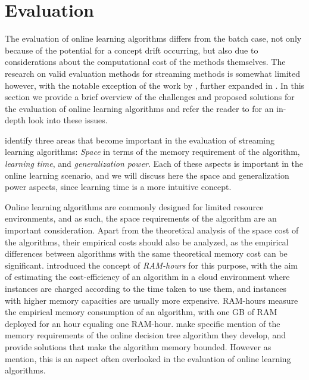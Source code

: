 
\section{Evaluation}
\label{sec:bg-ol-evaluation}

The evaluation of online learning algorithms differs from the batch
case, not only because of the potential for a concept drift occurring,
but also due to considerations about the computational cost of the
methods themselves. The research on valid evaluation methods for
streaming methods is somewhat limited however, with the notable exception
of the work by \citet{online-evaluation-kdd}, further expanded in
\cite{online-evaluation-journal}.
In this section we provide
a brief overview of the challenges and proposed solutions for
the evaluation of online learning algorithms and refer the
reader to \cite{online-evaluation-journal} for an in-depth look
into these issues.

\citet{online-evaluation-journal} identify three areas that
become important in the evaluation of streaming learning
algorithms: \emph{Space} in terms of the memory requirement of the algorithm, \emph{learning time}, and \emph{generalization power}.
Each of these aspects is important in the online learning scenario, and
we will discuss here the space and generalization power aspects, since
learning time is a more intuitive concept.


Online learning algorithms are commonly designed for limited resource environments,
and as such, the space requirements of the algorithm are an important consideration.
Apart from the theoretical analysis of the space cost of the algorithms,
their empirical costs should also be analyzed, as the empirical differences
between algorithms with the same theoretical memory cost can be
significant. \citet{ram-hours} introduced
the concept of \emph{RAM-hours} for this purpose, with the aim of estimating
the cost-efficiency of an algorithm in a cloud environment where instances
are charged according to the time taken to use them, and instances with
higher memory capacities are usually more expensive.
RAM-hours measure the empirical memory consumption of an
algorithm, with one GB of RAM deployed for an hour equaling one RAM-hour.
\citet{vfdt}
make specific mention of the memory requirements of the online decision
tree algorithm they develop, and provide solutions that make the algorithm
memory bounded. However as \citet{online-evaluation-journal} mention, this
is an aspect often overlooked in the evaluation of online learning
algorithms.

